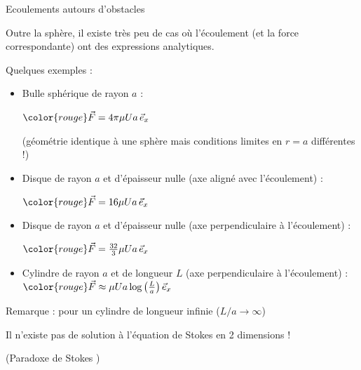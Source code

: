 \begin{frame}{Ecoulements autours d'obstacles}



Outre la sphère, il existe très peu de cas où l'écoulement (et la force correspondante)
ont des expressions analytiques.
\medskip

Quelques exemples :

\medskip
\begin{itemize}

\item
Bulle sphérique de rayon $a$ :

$ \color{rouge} 
  \myvec{F} 
  =
  4\pi \mu U a \, \myvec{e}_{x}
$

(géométrie identique à une sphère mais conditions limites en $r=a$ différentes !)

\vspace{0mm}

\medskip 
\item Disque de rayon $a$ et d'épaisseur nulle (axe aligné avec l'écoulement) : %

$ \color{rouge} 
  \myvec{F} 
  =
  16 \mu U a \, \myvec{e}_{x}  
$

\medskip 
\item Disque de rayon $a$ et d'épaisseur nulle (axe perpendiculaire à l'écoulement) :

$ \color{rouge} 
 \myvec{F} 
  =
  \frac{32}{3}  \mu U a \, \myvec{e}_{x}
$
\medskip


\item Cylindre de rayon $a$ et de longueur $L$ (axe perpendiculaire à l'écoulement) :
$ \color{rouge} 
  \myvec{F} 
  \approx \mu U a \log \left( \frac{L}{a} \right)   \myvec{e}_{x}
$
\end{itemize}

\medskip

Remarque : pour un cylindre de longueur infinie ($L/a \rightarrow \infty$) 

Il n'existe pas de solution à l'équation de Stokes en 2 dimensions !

(Paradoxe de Stokes )

\end{frame}


